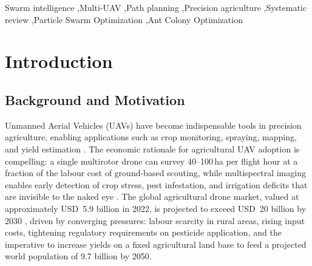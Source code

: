 \documentclass[review,3p,times]{elsarticle}
\begin{document}
\begin{frontmatter}
\begin{abstract}
\textbf{Conclusions:} Current research on SI-based multi-UAV path planning in agriculture remains heavily simulation-oriented and lacks standardised benchmarking frameworks. This study provides the first structured gap analysis for this domain, documents 171 research gaps across four dimensions, and proposes a research agenda emphasising experimental validation, dynamic environment modelling, and standardised evaluation metrics through the open AgriSwarm-Bench framework to accelerate practical deployment of swarm-based agricultural UAV systems.
\end{abstract}

\begin{keyword}
Swarm intelligence \sep Multi-UAV \sep Path planning \sep Precision agriculture \sep Systematic review \sep Particle Swarm Optimization \sep Ant Colony Optimization
\end{keyword}

\end{frontmatter}

\section{Introduction}

\subsection{Background and Motivation}

Unmanned Aerial Vehicles (UAVs) have become indispensable tools in precision agriculture, enabling applications such as crop monitoring, spraying, mapping, and yield estimation \cite{zhang2012,tsouros2019,puri2017,mogili2018,hunt2018}. The economic rationale for agricultural UAV adoption is compelling: a single multirotor drone can survey 40--100\,ha per flight hour at a fraction of the labour cost of ground-based scouting, while multispectral imaging enables early detection of crop stress, pest infestation, and irrigation deficits that are invisible to the naked eye \cite{hunt2018,zhang2012}. The global agricultural drone market, valued at approximately USD~5.9 billion in 2022, is projected to exceed USD~20 billion by 2030 \cite{tsouros2019,mogili2018}, driven by converging pressures: labour scarcity in rural areas, rising input costs, tightening regulatory requirements on pesticide application, and the imperative to increase yields on a fixed agricultural land base to feed a projected world population of 9.7 billion by 2050.
\end{document}
